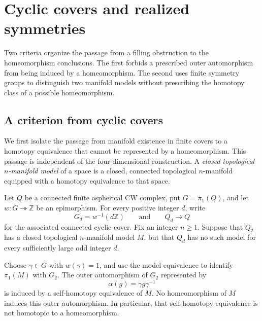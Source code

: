 \section{Cyclic covers and realized symmetries}\label{sec:cyclic}

Two criteria organize the passage from a filling obstruction to the
homeomorphism conclusions.  The first forbids a prescribed outer
automorphism from being induced by a homeomorphism.  The second uses
finite symmetry groups to distinguish two manifold models without
prescribing the homotopy class of a possible homeomorphism.

\subsection{A criterion from cyclic covers}

We first isolate the passage from manifold existence in finite covers to
a homotopy equivalence that cannot be represented by a homeomorphism.
This passage is independent of the four-dimensional construction.
A \emph{closed topological $n$-manifold model} of a space is a closed,
connected topological $n$-manifold equipped with a homotopy equivalence
to that space.

\begin{theorem}\label{cyc:criterion}
Let $Q$ be a connected finite aspherical CW complex, put
$G=\pi_1(Q)$, and let $w\colon G\twoheadrightarrow\mathbb Z$ be an
epimorphism.  For every positive integer $d$, write
\[
 G_d=w^{-1}(d\mathbb Z)
 \qquad\text{and}\qquad
 Q_d\longrightarrow Q
\]
for the associated connected cyclic cover.  Fix an integer $n\geq1$.
Suppose that $Q_2$ has a closed topological $n$-manifold model $M$, but
that $Q_d$ has no such model for every sufficiently large odd integer
$d$.

Choose $\gamma\in G$ with $w(\gamma)=1$, and use the model equivalence
to identify $\pi_1(M)$ with $G_2$.  The outer automorphism of $G_2$
represented by
\[
 \alpha(g)=\gamma g\gamma^{-1}
\]
is induced by a self-homotopy equivalence of $M$.  No homeomorphism of
$M$ induces this outer automorphism.  In particular, that
self-homotopy equivalence is not homotopic to a homeomorphism.
\end{theorem}

